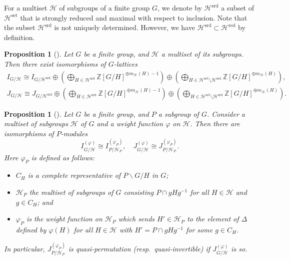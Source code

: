 \documentclass[12pt]{amsart}
\theoremstyle{plain}
\newtheorem{prop}[thm]{Proposition}
\theoremstyle{definition}
\numberwithin{thm}{section}
\numberwithin{equation}{section}
\newcommand{\Z}{\mathbb{Z}}
\newcommand{\cH}{\mathcal{H}}
\DeclareMathOperator{\red}{red}
\DeclareMathOperator{\set}{set}
\DeclareMathOperator{\srd}{srd}
\begin{document}
For a multiset $\cH$ of subgroups of a finite group $G$, we denote by $\cH^{\srd}$ a subset of $\cH^{\set}$ that is strongly reduced and maximal with respect to inclusion. Note that the subset $\cH^{\srd}$ is not uniquely determined. However, we have $\cH^{\srd}\subset \cH^{\red}$ by definition. 

\begin{prop}[{\cite[Proposition 3.16]{Hasegawa}}]\label{prop:rdsr}
Let $G$ be a finite group, and $\cH$ a multiset of its subgroups. Then there exist isomorphisms of $G$-lattices
\begin{gather*}
    I_{G/\cH}\cong I_{G/\cH^{\srd}}\oplus \left(\bigoplus_{H\in \cH^{\srd}}\Z[G/H]^{\oplus m_{\cH}(H)-1}\right) \oplus \left(\bigoplus_{H\in \cH^{\set}\setminus \cH^{\srd}}\Z[G/H]^{\oplus m_{\cH}(H)}\right),\\ 
    J_{G/\cH}\cong J_{G/\cH^{\srd}}\oplus \left(\bigoplus_{H\in \cH^{\srd}}\Z[G/H]^{\oplus m_{\cH}(H)-1}\right) \oplus \left(\bigoplus_{H\in \cH^{\set}\setminus \cH^{\srd}}\Z[G/H]^{\oplus m_{\cH}(H)}\right). 
\end{gather*}
\end{prop}

\begin{prop}[{\cite[Proposition 3.20]{Hasegawa}}]\label{prop:rtmc}
Let $G$ be a finite group, and $P$ a subgroup of $G$. Consider a multiset of subgroups $\cH$ of $G$ and a weight function $\varphi$ on $\cH$. Then there are isomorphisms of $P$-modules
\begin{equation*}
    I_{G/\cH}^{(\varphi)}\cong I_{P/\cH_{P}}^{(\varphi_{P})},\quad J_{G/\cH}^{(\varphi)}\cong J_{P/\cH_{P}}^{(\varphi_{P})}. 
\end{equation*}
Here $\varphi_{P}$ is defined as follows:
\begin{itemize}
    \item $C_{H}$ is a complete representative of $P\backslash G/H$ in $G$; 
    \item $\cH_{P}$ the multiset of subgroups of $G$ consisting $P\cap gHg^{-1}$ for all $H\in \cH$ and $g \in C_{H}$; and 
    \item $\varphi_{P}$ is the weight function on $\cH_{P}$ which sends $H'\in \cH_{P}$ to the element of $\Delta$ defined by $\varphi(H)$ for all $H\in \cH$ with $H'=P\cap gHg^{-1}$ for some $g\in C_{H}$. 
\end{itemize}
In particular, $J_{P/\cH_{P}}^{(\varphi_{P})}$ is quasi-permutation (resp.~quasi-invertible) if $J_{G/\cH}^{(\varphi)}$ is so. 
\end{prop}
\end{document}

